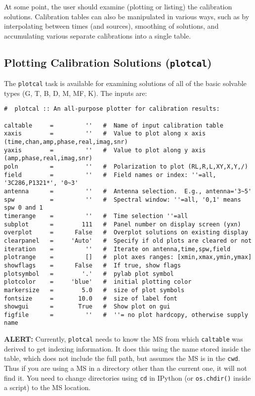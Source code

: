 At some point, the user should examine (plotting or listing) the
calibration solutions.
Calibration tables can also be manipulated in various ways, such as
by interpolating between times (and sources), smoothing of solutions,
and accumulating various separate calibrations into a single 
table.

\subsection{Plotting Calibration Solutions ({\tt plotcal})}
\label{section:cal.tables.plotcal}

The {\tt plotcal} task is available for examining solutions of all of
the basic solvable types (G, T, B, D, M, MF, K).  The inputs are:
\small
\begin{verbatim}
#  plotcal :: An all-purpose plotter for calibration results:

caltable     =         ''   #  Name of input calibration table
xaxis        =         ''   #  Value to plot along x axis (time,chan,amp,phase,real,imag,snr)
yaxis        =         ''   #  Value to plot along y axis (amp,phase,real,imag,snr)
poln         =         ''   #  Polarization to plot (RL,R,L,XY,X,Y,/)
field        =         ''   #  Field names or index: ''=all, '3C286,P1321*', '0~3'
antenna      =         ''   #  Antenna selection.  E.g., antenna='3~5'
spw          =         ''   #  Spectral window: ''=all, '0,1' means spw 0 and 1
timerange    =         ''   #  Time selection ''=all
subplot      =        111   #  Panel number on display screen (yxn)
overplot     =      False   #  Overplot solutions on existing display
clearpanel   =     'Auto'   #  Specify if old plots are cleared or not
iteration    =         ''   #  Iterate on antenna,time,spw,field
plotrange    =         []   #  plot axes ranges: [xmin,xmax,ymin,ymax]
showflags    =      False   #  If true, show flags
plotsymbol   =        '.'   #  pylab plot symbol
plotcolor    =     'blue'   #  initial plotting color
markersize   =        5.0   #  size of plot symbols
fontsize     =       10.0   #  size of label font
showgui      =       True   #  Show plot on gui
figfile      =         ''   #  ''= no plot hardcopy, otherwise supply name
\end{verbatim}
\normalsize

{\bf ALERT:} Currently, {\tt plotcal} needs to know the MS from
which {\tt caltable} was derived to get indexing information.  It does
this using the name stored inside the table, which does not include
the full path, but assumes the MS is in the {\tt cwd}.  Thus if you
are using a MS in a directory other than the current one, it will not
find it.  You need to change directories using {\tt cd} in
IPython (or {\tt os.chdir()} inside a script) to the MS location.

